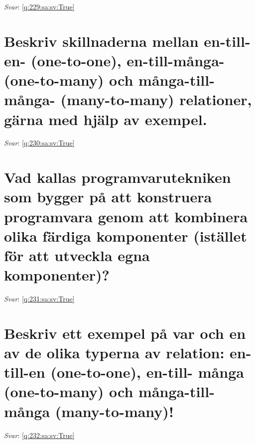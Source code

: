 \documentclass[a4paper,11pt,oneside]{book}
\begin{document}
\begin{sloppypar}
\textit{Svar}: \autoref{q:229:sa:sv:True}



\section{Beskriv skillnaderna mellan en-till-en- (one-to-one), en-till-m\r{a}nga- (one-to-many) och m\r{a}nga-till- m\r{a}nga- (many-to-many) relationer, g\"arna med hj\"alp av exempel.}

\label{q:230:sa:sv:False}

\vspace{2cm}

\noindent\makebox[\textwidth]{\hrulefill}

\vspace{1cm}

\textit{Svar}: \autoref{q:230:sa:sv:True}



\section{Vad kallas programvarutekniken som bygger p\r{a} att konstruera programvara genom att kombinera olika f\"ardiga komponenter (ist\"allet f\"or att utveckla egna komponenter)?}

\label{q:231:sa:sv:False}

\vspace{2cm}

\noindent\makebox[\textwidth]{\hrulefill}

\vspace{1cm}

\textit{Svar}: \autoref{q:231:sa:sv:True}



\section{Beskriv ett exempel p\r{a} var och en av de olika typerna av relation: en-till-en (one-to-one), en-till- m\r{a}nga (one-to-many) och m\r{a}nga-till-m\r{a}nga (many-to-many)!}

\label{q:232:sa:sv:False}

\vspace{2cm}

\noindent\makebox[\textwidth]{\hrulefill}

\vspace{1cm}

\textit{Svar}: \autoref{q:232:sa:sv:True}




\end{sloppypar}
\end{document}
